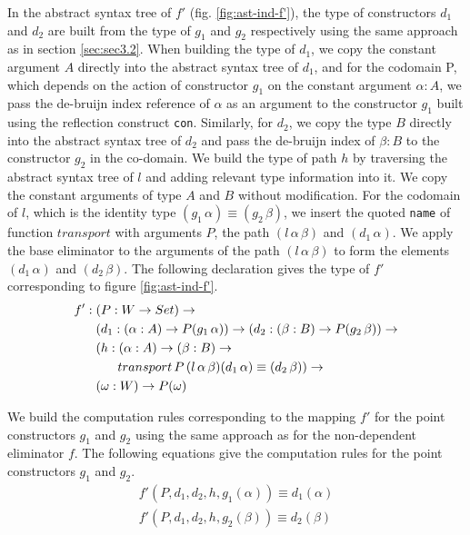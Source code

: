 \documentclass[sigplan,10pt]{acmart}
\begin{document}
In the abstract syntax tree of $f'$ (fig. \ref{fig:ast-ind-f'}), the type of constructors $d_1$ and $d_2$ are built from the type of $g_1$ and $g_2$ respectively using the same approach as in section \eqref{sec:sec3.2}. When building the type of $d_1$, we copy the constant argument $A$ directly into the abstract syntax tree of $d_1$, and for the codomain P, which depends on the action of constructor $g_1$ on the constant argument $\alpha : A$, we pass the de-bruijn index reference of $\alpha$ as an argument to the constructor $g_1$ built using the reflection construct {\tt con}. Similarly, for $d_2$, we copy the type $B$ directly into the abstract syntax tree of $d_2$ and pass the de-bruijn index of $\beta : B$ to the constructor $g_2$ in the co-domain. We build the type of path $h$ by traversing the abstract syntax tree of $l$ and adding relevant type information into it. We copy the constant arguments of type $A$ and $B$ without modification. For the codomain of $l$, which is the identity type $(g_1 \, \alpha) \equiv (g_2 \, \beta)$, we insert the quoted {\tt name} of function $transport$ with arguments $P$, the path $(l \, \alpha \, \beta)$ and $(d_1 \, \alpha)$. We apply the base eliminator to the arguments of the path $(l \, \alpha \, \beta)$ to form the elements $(d_1 \, \alpha)$ and $(d_2 \, \beta)$. The following declaration gives the type of $f'$ corresponding to figure \eqref{fig:ast-ind-f'}. 
\begin{align}
& f' : (P : W \rightarrow Set) \rightarrow \nonumber \\
& \hspace {0.6cm} (d_1 : (\alpha : A) \rightarrow P (g_1 \, \alpha)) \rightarrow (d_2 : (\beta : B) \rightarrow P (g_2 \, \beta)) \rightarrow \nonumber \\ 
& \hspace {0.6cm} (h : (\alpha : A) \rightarrow (\beta : B) \rightarrow \nonumber \\
& \hspace {1.2cm} transport \, P \, (l \, \alpha \, \beta) (d_1 \, \alpha) \equiv (d_2 \, \beta)) \rightarrow \nonumber \\
& \hspace {0.6cm} (\omega : W) \rightarrow P (\omega) \nonumber
\end{align}

We build the computation rules corresponding to the mapping $f'$ for the point constructors $g_1$ and $g_2$ using the same approach as for the non-dependent eliminator $f$. The following equations give the computation rules for the point constructors $g_1$ and $g_2$.
\begin{align}
f' (P, d_1, d_2, h, g_1 (\alpha)) \equiv d_1 (\alpha) \nonumber \\
f' (P, d_1, d_2, h, g_2 (\beta)) \equiv d_2 (\beta) \nonumber
\end{align}
\end{document}
